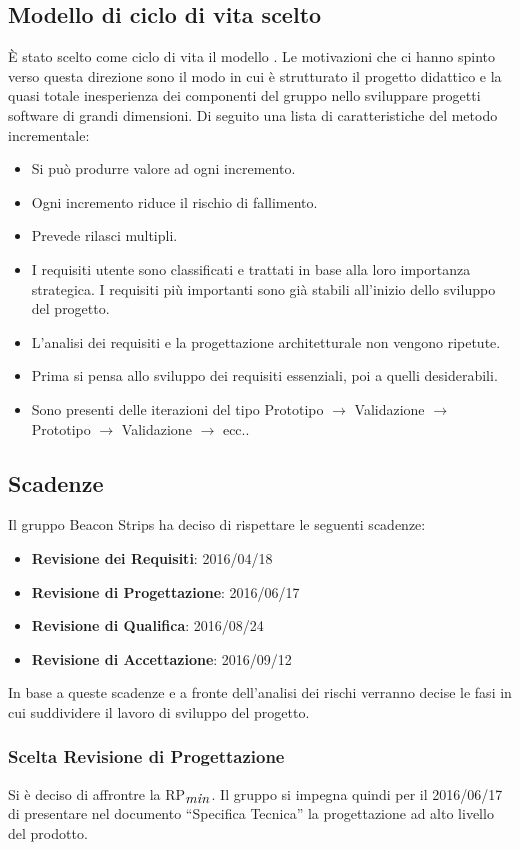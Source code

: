 	\subsection{Modello di ciclo di vita scelto}
	È stato scelto come ciclo di vita il modello . Le motivazioni che ci hanno spinto verso questa direzione sono il modo in cui è strutturato il progetto didattico e la quasi totale inesperienza dei componenti del gruppo nello sviluppare progetti software di grandi dimensioni. Di seguito una lista di caratteristiche del metodo incrementale:
	\begin{itemize}
		\item Si può produrre valore ad ogni incremento.
		\item Ogni incremento riduce il rischio di fallimento.
		\item Prevede rilasci multipli.
		\item I requisiti utente sono classificati e trattati in base alla loro importanza strategica. I requisiti più importanti sono già stabili all'inizio dello sviluppo del progetto.
		\item L'analisi dei requisiti e la progettazione architetturale non vengono ripetute.
		\item Prima si pensa allo sviluppo dei requisiti essenziali, poi a quelli desiderabili.
		\item Sono presenti delle iterazioni del tipo Prototipo $\rightarrow$ Validazione $\rightarrow$ Prototipo $\rightarrow$ Validazione $\rightarrow$ ecc..
	\end{itemize}
	\subsection{Scadenze}
	Il gruppo Beacon Strips ha deciso di rispettare le seguenti scadenze:
	\begin{itemize}
		\item \textbf{Revisione dei Requisiti}: 2016/04/18
		\item \textbf{Revisione di Progettazione}: 2016/06/17
		\item \textbf{Revisione di Qualifica}: 2016/08/24
		\item \textbf{Revisione di Accettazione}: 2016/09/12
	\end{itemize}
	In base a queste scadenze e a fronte dell'analisi dei rischi verranno decise le fasi in cui suddividere il lavoro di sviluppo del progetto.
	\subsubsection{Scelta Revisione di Progettazione}
	Si è deciso di affrontre la RP$_{\mbox{\textit{min}}}$. Il gruppo si impegna quindi per il 2016/06/17 di presentare nel documento ``Specifica Tecnica'' la progettazione ad alto livello del prodotto.
	